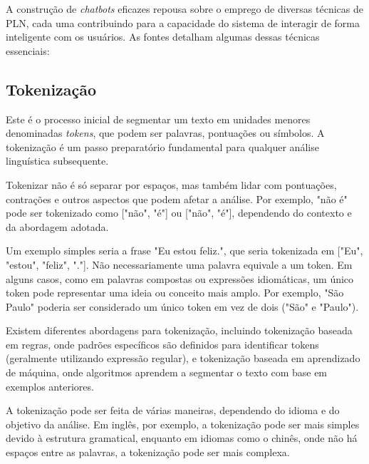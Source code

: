 \documentclass[14pt,a4paper,oneside]{book}
\begin{document}
A construção de \textit{chatbots} eficazes repousa sobre o emprego de diversas técnicas de PLN, cada uma contribuindo para a capacidade do sistema de interagir de forma inteligente com os usuários. As fontes detalham algumas dessas técnicas essenciais:

\subsection{Tokenização}

Este é o processo inicial de segmentar um texto em unidades menores denominadas \textit{tokens}, que podem ser palavras, pontuações ou símbolos. A tokenização é um passo preparatório fundamental para qualquer análise linguística subsequente. 

Tokenizar não é só separar por espaços, mas também lidar com pontuações, contrações e outros aspectos que podem afetar a análise. Por exemplo, "não é" pode ser tokenizado como ["não", "é"] ou ["não", "é"], dependendo do contexto e da abordagem adotada. 

Um exemplo simples seria a frase "Eu estou feliz.", que seria tokenizada em ["Eu", "estou", "feliz", "."]. Não necessariamente uma palavra equivale a um token. Em alguns casos, como em palavras compostas ou expressões idiomáticas, um único token pode representar uma ideia ou conceito mais amplo. Por exemplo, "São Paulo" poderia ser considerado um único token em vez de dois ("São" e "Paulo"). 


Existem diferentes abordagens para tokenização, incluindo tokenização baseada em regras, onde padrões específicos são definidos para identificar tokens (geralmente utilizando expressão regular), e tokenização baseada em aprendizado de máquina, onde algoritmos aprendem a segmentar o texto com base em exemplos anteriores.

A tokenização pode ser feita de várias maneiras, dependendo do idioma e do objetivo da análise. Em inglês, por exemplo, a tokenização pode ser mais simples devido à estrutura gramatical, enquanto em idiomas como o chinês, onde não há espaços entre as palavras, a tokenização pode ser mais complexa.
\end{document}
